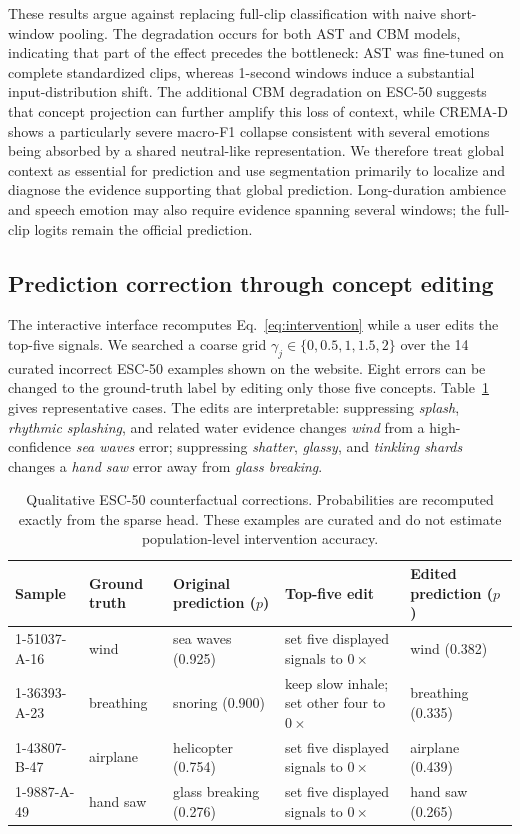 \documentclass[10pt]{article}
\begin{document}
These results argue against replacing full-clip classification with naive short-window pooling. The degradation occurs for both AST and CBM models, indicating that part of the effect precedes the bottleneck: AST was fine-tuned on complete standardized clips, whereas 1-second windows induce a substantial input-distribution shift. The additional CBM degradation on ESC-50 suggests that concept projection can further amplify this loss of context, while CREMA-D shows a particularly severe macro-F1 collapse consistent with several emotions being absorbed by a shared neutral-like representation. We therefore treat global context as essential for prediction and use segmentation primarily to localize and diagnose the evidence supporting that global prediction. Long-duration ambience and speech emotion may also require evidence spanning several windows; the full-clip logits remain the official prediction.

\subsection{Prediction correction through concept editing}
The interactive interface recomputes Eq.~\eqref{eq:intervention} while a user edits the top-five signals. We searched a coarse grid $\gamma_j\in\{0,0.5,1,1.5,2\}$ over the 14 curated incorrect ESC-50 examples shown on the website. Eight errors can be changed to the ground-truth label by editing only those five concepts. Table~\ref{tab:corrections} gives representative cases. The edits are interpretable: suppressing \emph{splash}, \emph{rhythmic splashing}, and related water evidence changes \emph{wind} from a high-confidence \emph{sea waves} error; suppressing \emph{shatter}, \emph{glassy}, and \emph{tinkling shards} changes a \emph{hand saw} error away from \emph{glass breaking}.

\begin{table}[t]
\centering
\small
\caption{Qualitative ESC-50 counterfactual corrections. Probabilities are recomputed exactly from the sparse head. These examples are curated and do not estimate population-level intervention accuracy.}
\label{tab:corrections}
\setlength{\tabcolsep}{4.8pt}
\begin{tabular}{lllll}
\toprule
Sample & Ground truth & Original prediction ($p$) & Top-five edit & Edited prediction ($p$) \\
\midrule
1-51037-A-16 & wind & sea waves (0.925) & set five displayed signals to $0\times$ & wind (0.382) \\
1-36393-A-23 & breathing & snoring (0.900) & keep slow inhale; set other four to $0\times$ & breathing (0.335) \\
1-43807-B-47 & airplane & helicopter (0.754) & set five displayed signals to $0\times$ & airplane (0.439) \\
1-9887-A-49 & hand saw & glass breaking (0.276) & set five displayed signals to $0\times$ & hand saw (0.265) \\
\bottomrule
\end{tabular}
\end{table}
\end{document}
